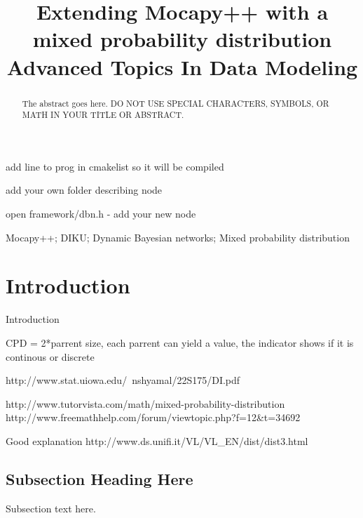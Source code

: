 \documentclass[10pt, conference, compsocconf,a4paper]{IEEEtran}
\begin{document}
\title{Extending Mocapy++ with a mixed probability distribution\\Advanced Topics In Data Modeling}


\author{
}

\maketitle


add line to prog in cmakelist so it will be compiled

add your own folder describing node

open framework/dbn.h - add your new node



\begin{abstract}
The abstract goes here. DO NOT USE SPECIAL CHARACTERS, SYMBOLS, OR MATH IN YOUR TITLE OR ABSTRACT.

\end{abstract}

\begin{IEEEkeywords}
Mocapy++; DIKU; Dynamic Bayesian networks; Mixed probability distribution

\end{IEEEkeywords}


\section{Introduction}
Introduction

CPD = 2*parrent size, each parrent can yield a value, the indicator shows if it is continous or discrete


http://www.stat.uiowa.edu/~nshyamal/22S175/DI.pdf

http://www.tutorvista.com/math/mixed-probability-distribution
http://www.freemathhelp.com/forum/viewtopic.php?f=12&t=34692

Good explanation
http://www.ds.unifi.it/VL/VL_EN/dist/dist3.html

\subsection{Subsection Heading Here}
Subsection text here.
\end{document}
